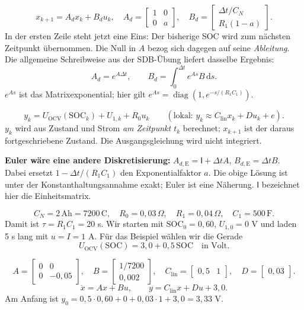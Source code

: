 \[
\boxed{x_{k+1}=A_dx_k+B_du_k},\quad
\boxed{A_d=\begin{bmatrix}1&0\\0&a\end{bmatrix}},\quad
\boxed{B_d=\begin{bmatrix}\Delta t/C_N\\R_1(1-a)\end{bmatrix}}.
\]
In der ersten Zeile steht jetzt eine Eins: Der bisherige SOC wird zum nächsten Zeitpunkt übernommen. Die Null in $A$ bezog sich dagegen auf seine \emph{Ableitung}.
Die allgemeine Schreibweise aus der SDB-Übung liefert dasselbe Ergebnis:
\[
A_d=e^{A\Delta t},\qquad B_d=\int_0^{\Delta t}e^{As}B\,\mathrm ds.
\]
$e^{As}$ ist das Matrixexponential; hier gilt $e^{As}=\operatorname{diag}(1,e^{-s/(R_1C_1)})$.

\[
\boxed{y_k=U_{\mathrm{OCV}}(\mathrm{SOC}_k)+U_{1,k}+R_0u_k}
\qquad (\text{lokal: } y_k\approx C_{\mathrm{lin}}x_k+Du_k+e).
\]
$y_k$ wird aus Zustand und Strom \emph{am Zeitpunkt $t_k$} berechnet; $x_{k+1}$ ist der daraus fortgeschriebene Zustand. Die Ausgangsgleichung wird nicht integriert.

\textbf{Euler wäre eine andere Diskretisierung:}
$A_{d,\mathrm E}=\mathsf I+\Delta t A$, $B_{d,\mathrm E}=\Delta t B$. Dabei ersetzt $1-\Delta t/(R_1C_1)$ den Exponentialfaktor $a$. Die obige Lösung ist unter der Konstanthaltungsannahme exakt; Euler ist eine Näherung. $\mathsf I$ bezeichnet hier die Einheitsmatrix.

\[
C_N=2\,\mathrm{Ah}=7200\,\mathrm C,\quad R_0=0{,}03\,\Omega,\quad
R_1=0{,}04\,\Omega,\quad C_1=500\,\mathrm F.
\]
Damit ist $\tau=R_1C_1=20$ s. Wir starten mit $\mathrm{SOC}_0=0{,}60$, $U_{1,0}=0$ V und laden 5 s lang mit $u=I=1$ A. Für das Beispiel wählen wir die Gerade
\[
U_{\mathrm{OCV}}(\mathrm{SOC})=3{,}0+0{,}5\,\mathrm{SOC}\quad\text{in Volt}.
\]

\[
A=\begin{bmatrix}0&0\\0&-0{,}05\end{bmatrix},\quad
B=\begin{bmatrix}1/7200\\0{,}002\end{bmatrix},\quad
C_{\mathrm{lin}}=\begin{bmatrix}0{,}5&1\end{bmatrix},\quad D=\begin{bmatrix}0{,}03\end{bmatrix}.
\]
\[
\dot x=Ax+Bu,\qquad \boxed{y=C_{\mathrm{lin}}x+Du+3{,}0}.
\]
Am Anfang ist $y_0=0{,}5\cdot0{,}60+0+0{,}03\cdot1+3{,}0=3{,}33$ V.

